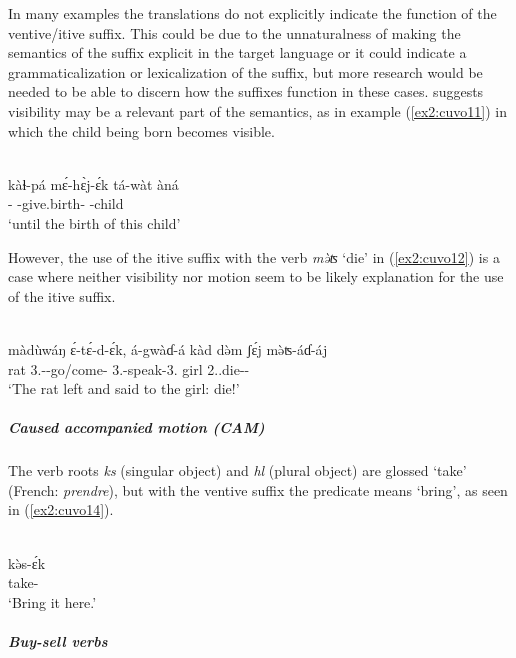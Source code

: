 In many examples the translations do not explicitly indicate the function of the ventive/itive suffix. This could be due to the unnaturalness of making the semantics of the suffix explicit in the target language or it could indicate a grammaticalization or lexicalization of the suffix, but more research would be needed to be able to discern how the suffixes function in these cases. \citet[303]{dadakGrammaireCuvokLangue2021} suggests visibility may be a relevant part of the semantics, as in example (\ref{ex2:cuvo11}) in which the child being born becomes visible.

\ea\label{ex2:cuvo11}
 \\
\gll kàɬ-pá	mɛ́-hɛ̀j-ɛ́k	tá-wàt	àná \\
-	-give.birth-	-child	 \\
\glt `until the birth of this child'
\z 

However, the use of the itive suffix with the verb \textit{mə̀ʦ} `die' in (\ref{ex2:cuvo12}) is a case where neither visibility nor motion seem to be likely explanation for the use of the itive suffix. 

\ea\label{ex2:cuvo12}
 \\
\gll màdùwáŋ	ɛ́-tɛ́-d-ɛ́k,	á-gwàɗ-á	kàd	də̀m	ʃɛ́j	 mə̀ʦ-áɗ-áj \\
rat	3.--go/come-	3.-speak-3.		girl		 2..die-- \\
\glt `The rat left and said to the girl: die!'
\z 

\subparagraph{Caused accompanied motion (CAM)}

The verb roots \textit{ks} (singular object) and \textit{hl} (plural object) are glossed `take' (French: \textit{prendre}), but with the ventive suffix the predicate means `bring', as seen in (\ref{ex2:cuvo14}). 

\ea\label{ex2:cuvo14}
 \\
\gll  kə̀s-ɛ́k	\\
take-	\\
\glt `Bring it here.'
\z 

\subparagraph{Buy-sell verbs}

